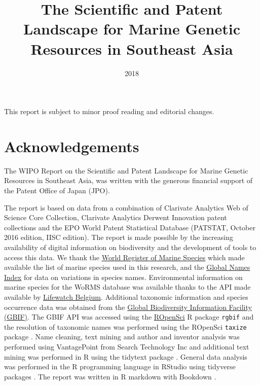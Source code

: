 \documentclass[]{book}
\title{The Scientific and Patent Landscape for Marine Genetic Resources in
Southeast Asia}
\author{}
\date{2018}
\theoremstyle{definition}
\theoremstyle{definition}
\theoremstyle{definition}
\theoremstyle{remark}
\begin{document}
\maketitle

{
\setcounter{tocdepth}{2}
\tableofcontents
}
\hypertarget{section}{%
\chapter*{}\label{section}}

This report is subject to minor proof reading and editorial changes.

\hypertarget{acknowledgements}{%
\chapter*{Acknowledgements}\label{acknowledgements}}

The WIPO Report on the Scientific and Patent Landscape for Marine
Genetic Resources in Southeast Asia, was written with the generous
financial support of the Patent Office of Japan (JPO).

The report is based on data from a combination of Clarivate Analytics
Web of Science Core Collection, Clarivate Analytics Derwent Innovation
patent collections and the EPO World Patent Statistical Database
(PATSTAT, October 2016 edition, IISC edition). The report is made
possible by the increasing availability of digital information on
biodiversity and the development of tools to access this data. We thank
the \href{http://www.marinespecies.org/}{World Register of Marine
Species} which made available the list of marine species used in this
research, and the \href{http://gni.globalnames.org/}{Global Names Index}
for data on variations in species names. Environmental information on
marine species for the WoRMS database was available thanks to the API
made available by
\href{http://www.lifewatch.be/data-services/?cache=1521050271}{Lifewatch
Belgium}. Additional taxonomic information and species occurrence data
was obtained from the \href{https://www.gbif.org/}{Global Biodiversity
Information Facility (GBIF)}. The GBIF API was accessed using the
\href{https://ropensci.org/}{ROpenSci} R package \texttt{rgbif} and the
resolution of taxonomic names was performed using the ROpenSci
\texttt{taxize} package \citep{R-rgbif, R-taxize}. Name cleaning, text
mining and author and inventor analysis was performed using VantagePoint
from Search Technology Inc and additional text mining was performed in R
using the tidytext package \citep{R-tidytext}. General data analysis was
performed in the R programming language in RStudio using tidyverse
packages \citep{R-base, R-tidyverse}. The report was written in R
markdown with Bookdown \citep{R-rmarkdown, R-bookdown}.
\end{document}
